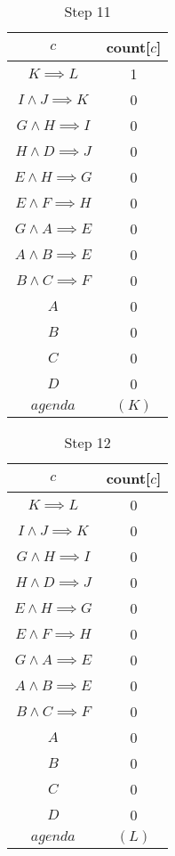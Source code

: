 \documentclass[12pt]{article}
\begin{document}
\begin{itemize}
\begin{table}[H]
\centering
\caption*{Step 11}
\label{my-label1}
\begin{tabular}{ c c }
\hline
$c$ & count[$c$]\\ \hline
$K \implies L$ & 1\\
$I \land J \implies K$ & 0\\
$G \land H \implies I$ & 0\\
$H \land D \implies J$ & 0\\
$E \land H \implies G$ & 0\\
$E \land F \implies H$ & 0\\
$G \land A \implies E$ & 0\\
$A \land B \implies E$ & 0\\
$B \land C \implies F$ & 0\\
$A$ & 0\\
$B$ & 0\\
$C$ & 0\\
$D$ & 0\\ \hline
$agenda$ & $(K)$
\end{tabular}
\end{table}
		
\begin{table}[H]
\centering
\caption*{Step 12}
\label{my-label1}
\begin{tabular}{ c c }
\hline
$c$ & count[$c$]\\ \hline
$K \implies L$ & 0\\
$I \land J \implies K$ & 0\\
$G \land H \implies I$ & 0\\
$H \land D \implies J$ & 0\\
$E \land H \implies G$ & 0\\
$E \land F \implies H$ & 0\\
$G \land A \implies E$ & 0\\
$A \land B \implies E$ & 0\\
$B \land C \implies F$ & 0\\
$A$ & 0\\
$B$ & 0\\
$C$ & 0\\
$D$ & 0\\ \hline
$agenda$ & $(L)$
\end{tabular}
\end{table}
		

\end{itemize}
\end{document}
